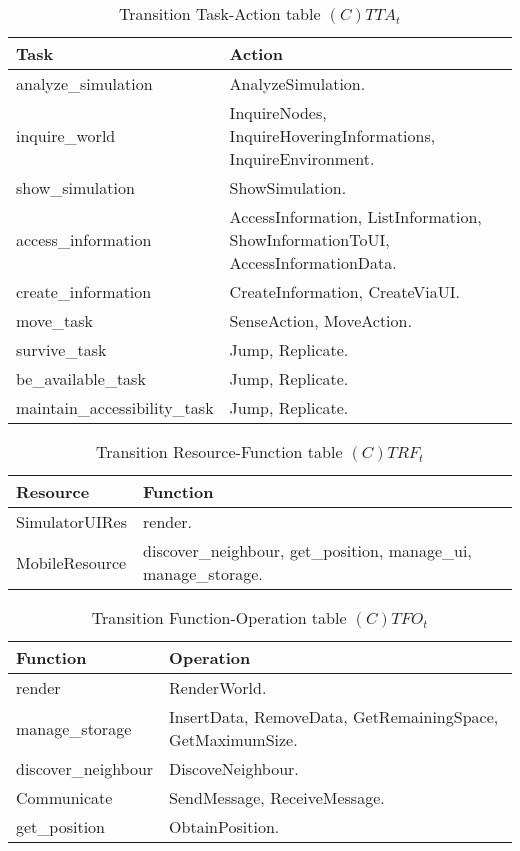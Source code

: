 \begin{table}[H]
	\centering
	\begin{tabular}{|p{4cm}|p{8cm}|}
			\hline
			\textbf{Task} & \textbf{Action} \\
			\hline
			analyze\_simulation & AnalyzeSimulation. \\
			\hline
			inquire\_world & InquireNodes, InquireHoveringInformations, InquireEnvironment. \\
			\hline
			show\_simulation & ShowSimulation. \\
			\hline
			access\_information & AccessInformation, ListInformation, ShowInformationToUI,
			AccessInformationData.\\
			\hline
			create\_information & CreateInformation, CreateViaUI. \\
			\hline
			move\_task & SenseAction, MoveAction. \\
			\hline
			survive\_task & Jump, Replicate. \\
			\hline
			be\_available\_task & Jump, Replicate. \\
			\hline
			maintain\_accessibility\_task & Jump, Replicate. \\
			\hline
		\end{tabular}
	\caption{Transition Task-Action table $(C)TTA_t$}
	\label{tab:cttat}
\end{table}

\begin{table}[H]
	\centering
	\begin{tabular}{|p{4cm}|p{8cm}|}
			\hline
			\textbf{Resource} & \textbf{Function} \\
			\hline
			SimulatorUIRes & render. \\
			\hline
			MobileResource & discover\_neighbour, get\_position, manage\_ui,
			manage\_storage. \\
			\hline
		\end{tabular}
	\caption{Transition Resource-Function table $(C)TRF_t$}
	\label{tab:ctrft}
\end{table}

\begin{table}[H]
	\centering
	\begin{tabular}{|p{4cm}|p{8cm}|}
			\hline
			\textbf{Function} & \textbf{Operation} \\
			\hline
			render & RenderWorld. \\
			\hline
			manage\_storage & InsertData, RemoveData, GetRemainingSpace,
			GetMaximumSize. \\
			\hline
			discover\_neighbour & DiscoveNeighbour. \\
			\hline
			Communicate & SendMessage, ReceiveMessage. \\
			\hline
			get\_position & ObtainPosition. \\
			\hline
		\end{tabular}
	\caption{Transition Function-Operation table $(C)TFO_t$}
	\label{tab:ctfot}
\end{table}


